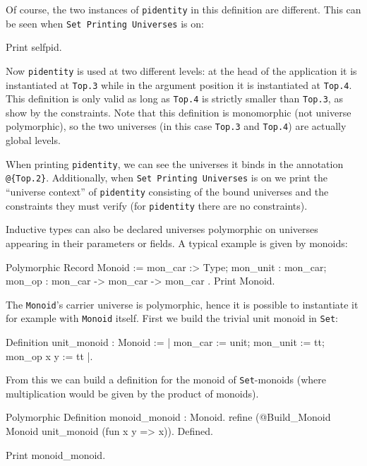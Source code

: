 Of course, the two instances of \texttt{pidentity} in this definition
are different. This can be seen when \texttt{Set Printing Universes} is
on:

\begin{coq_example}
Print selfpid.
\end{coq_example}

Now \texttt{pidentity} is used at two different levels: at the head of
the application it is instantiated at \texttt{Top.3} while in the
argument position it is instantiated at \texttt{Top.4}. This definition
is only valid as long as \texttt{Top.4} is strictly smaller than
\texttt{Top.3}, as show by the constraints. Note that this definition is
monomorphic (not universe polymorphic), so the two universes
(in this case \texttt{Top.3} and \texttt{Top.4}) are actually global levels.

When printing \texttt{pidentity}, we can see the universes it binds in
the annotation \texttt{@\{Top.2\}}. Additionally, when \texttt{Set
  Printing Universes} is on we print the ``universe context'' of
\texttt{pidentity} consisting of the bound universes and the
constraints they must verify (for \texttt{pidentity} there are no
constraints).

Inductive types can also be declared universes polymorphic on universes
appearing in their parameters or fields. A typical example is given by
monoids:

\begin{coq_example}
Polymorphic Record Monoid := { mon_car :> Type; mon_unit : mon_car; 
  mon_op : mon_car -> mon_car -> mon_car }.
Print Monoid.
\end{coq_example}

The \texttt{Monoid}'s carrier universe is polymorphic, hence it is
possible to instantiate it for example with \texttt{Monoid} itself.
First we build the trivial unit monoid in \texttt{Set}:
\begin{coq_example}
Definition unit_monoid : Monoid := 
  {| mon_car := unit; mon_unit := tt; mon_op x y := tt |}.
\end{coq_example} 

From this we can build a definition for the monoid of
\texttt{Set}-monoids (where multiplication would be given by the product
of monoids).

\begin{coq_example*}
Polymorphic Definition monoid_monoid : Monoid.
  refine (@Build_Monoid Monoid unit_monoid (fun x y => x)).
Defined.
\end{coq_example*}
\begin{coq_example}
Print monoid_monoid.
\end{coq_example} 

